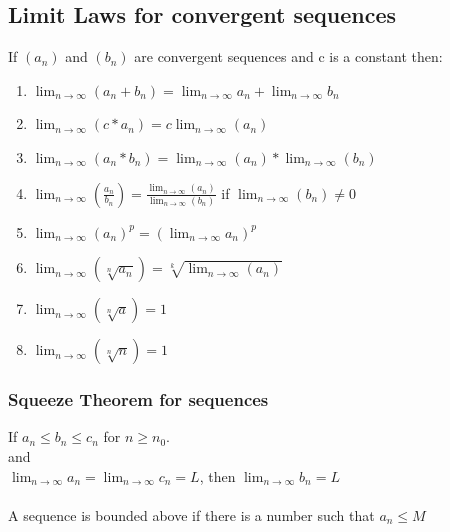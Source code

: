 \documentclass{article}
\begin{document}
 	\subsection{Limit Laws for convergent sequences}
 	If $(a_n)$ and $(b_n)$ are convergent sequences and c is a constant then:
 	\begin{enumerate}
 		\item $\lim_{n \to \infty } (a_n+b_n) = \lim_{n\to\infty} a_n + \lim_{n\to\infty} b_n$
 		\item $\lim_{n \to \infty } (c*a_n) = c\lim_{n \to \infty } (a_n)$
 		\item $\lim_{n \to \infty } (a_n*b_n) = \lim_{n \to \infty } (a_n) * \lim_{n \to \infty } (b_n)$
 		\item $\lim_{n \to \infty } (\frac{a_n}{b_n}) = \frac{\lim_{n \to \infty } (a_n)}{\lim_{n \to \infty } (b_n)}$ if $\lim_{n \to \infty } (b_n) \neq 0$ 
 		\item $\lim_{n \to \infty } (a_n)^p = (\lim_{n \to \infty }a_n)^p$
 		\item $\lim_{n \to \infty } (\sqrt[n]{a_n}) = \sqrt[k]{\lim_{n \to \infty } (a_n)}$
 		\item $\lim_{n \to \infty } (\sqrt[n]{a}) = 1$
 		\item $\lim_{n \to \infty } (\sqrt[n]{n}) = 1$
 	\end{enumerate}
 	\subsubsection{Squeeze Theorem for sequences}
 	If $a_n \leq b_n \leq c_n$ for $n \geq n_0$.\\
 	and \\
 	$\lim_{n\to\infty} a_n = \lim_{n\to\infty} c_n = L$, then $\lim_{n\to\infty} b_n = L$ \\ \\
 	A sequence is bounded above if there is a number such that $a_n \leq M $
 
 
 
 
 
 
 
 
 
 
 
 
 
 
 
 
 
 
 
 
 
 
 
 
 
 
 
 
 
\end{document}
